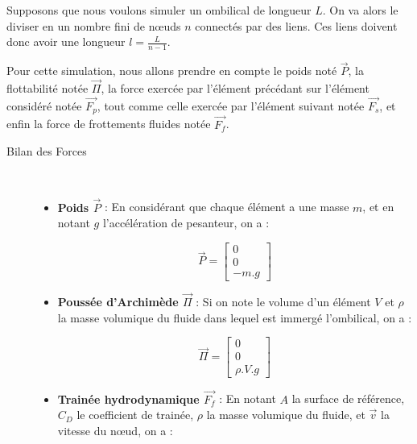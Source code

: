 				Supposons que nous voulons simuler un ombilical de longueur $L$. On va alors le diviser en un nombre fini de n\oe uds $n$ connectés par des liens. Ces liens doivent donc avoir une longueur $l=\frac{L}{n-1}$.
			
				Pour cette simulation, nous allons prendre en compte le poids noté $\overrightarrow{P}$, la flottabilité notée $\overrightarrow{\Pi}$, la force exercée par l'élément précédant sur l'élément considéré notée $\overrightarrow{F_p}$, tout comme celle exercée par l'élément suivant notée $\overrightarrow{F_s}$, et enfin la force de frottements fluides notée $\overrightarrow{F_f}$.
				
				\begin{description}
					\item [Bilan des Forces] \
					\begin{itemize}
						\item[\textbullet] \textbf{Poids $\overrightarrow{P}$} : En considérant que chaque élément a une masse $m$, et en notant $g$ l'accélération de pesanteur, on a : 
						
						\begin{equation}
							\overrightarrow{P} = \begin{bmatrix}0\\ 0\\ -m.g\end{bmatrix}
							\label{eq:poids}
						\end{equation}
				
						\item[\textbullet] \textbf{Poussée d'Archimède $\overrightarrow{\Pi}$} : Si on note le volume d'un élément $V$ et $\rho$ la masse volumique du fluide dans lequel est immergé l'ombilical, on a : 
						
						\begin{equation}
							\overrightarrow{\Pi} = \begin{bmatrix}0\\ 0\\ \rho.V.g\end{bmatrix}
							\label{eq:archimede}
						\end{equation}
				
						\item[\textbullet] \textbf{Trainée hydrodynamique $\overrightarrow{F_f}$} : En notant $A$ la surface de référence, $C_D$ le coefficient de trainée, $\rho$ la masse volumique du fluide, et $\overrightarrow{v}$ la vitesse du n\oe ud, on a : 
					

\end{itemize}
\end{description}
